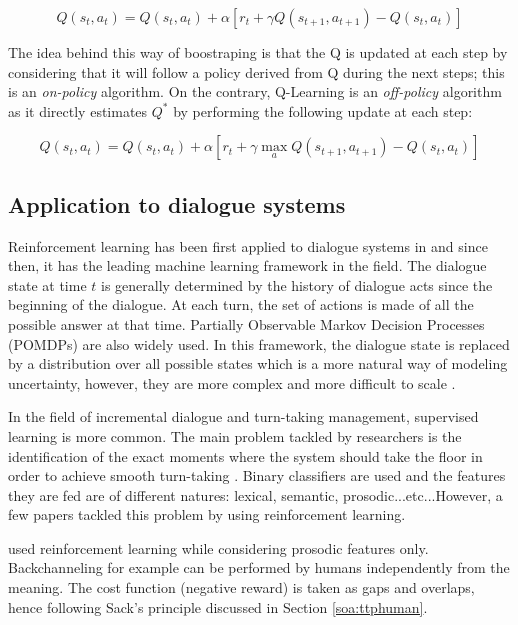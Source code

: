             $$ Q(s_t,a_t) = Q(s_t,a_t) + \alpha [r_t + \gamma Q(s_{t+1},a_{t+1}) - Q(s_t,a_t)] $$

        The idea behind this way of boostraping is that the Q is updated at each step by considering that it will follow a policy derived from Q during the next steps; this is an \textit{on-policy} algorithm. On the contrary, Q-Learning \cite{Watkins1989} is an \textit{off-policy} algorithm as it directly estimates $Q^*$ by performing the following update at each step:

            $$ Q(s_t,a_t) = Q(s_t,a_t) + \alpha [r_t + \gamma \max_a Q(s_{t+1},a_{t+1}) - Q(s_t,a_t)] $$


    \subsection{Application to dialogue systems}
    
    	Reinforcement learning has been first applied to dialogue systems in \cite{Levin1997} and since then, it has the leading machine learning framework in the field. The dialogue state at time $t$ is generally determined by the history of dialogue acts since the beginning of the dialogue. At each turn, the set of actions is made of all the possible answer at that time. Partially Observable Markov Decision Processes (POMDPs) are also widely used. In this framework, the dialogue state is replaced by a distribution over all possible states which is a more natural way of modeling uncertainty, however, they are more complex and more difficult to scale \cite{Lemon2007}.
        
        In the field of incremental dialogue and turn-taking management, supervised learning is more common. The main problem tackled by researchers is the identification of the exact moments where the system should take the floor in order to achieve smooth turn-taking \cite{Raux2008,Meena2013}. Binary classifiers are used and the features they are fed are of different natures: lexical, semantic, prosodic...etc...However, a few papers tackled this problem by using reinforcement learning.
        
        \cite{Jonsdottir2008} used reinforcement learning while considering prosodic features only. Backchanneling for example can be performed by humans independently from the meaning. The cost function (negative reward) is taken as gaps and overlaps, hence following Sack's principle discussed in Section \ref{soa:ttphuman}.
        
